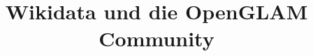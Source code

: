 \documentclass{article}
\begin{document}
\title{Wikidata und die OpenGLAM Community}

\maketitle
\end{document}
